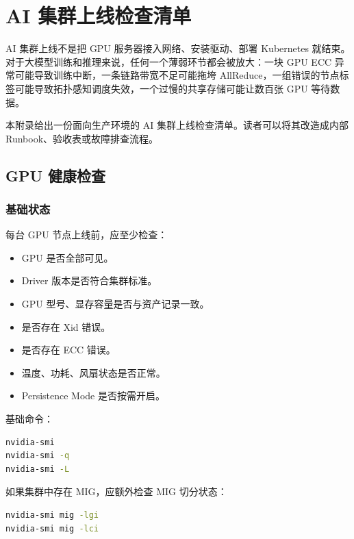 

\chapter{AI 集群上线检查清单}

AI 集群上线不是把 GPU 服务器接入网络、安装驱动、部署 Kubernetes 就结束。对于大模型训练和推理来说，任何一个薄弱环节都会被放大：一块 GPU ECC 异常可能导致训练中断，一条链路带宽不足可能拖垮 AllReduce，一组错误的节点标签可能导致拓扑感知调度失效，一个过慢的共享存储可能让数百张 GPU 等待数据。

本附录给出一份面向生产环境的 AI 集群上线检查清单。读者可以将其改造成内部 Runbook、验收表或故障排查流程。

\section{GPU 健康检查}

\subsection{基础状态}

每台 GPU 节点上线前，应至少检查：

\begin{itemize}
\item GPU 是否全部可见。
\item Driver 版本是否符合集群标准。
\item GPU 型号、显存容量是否与资产记录一致。
\item 是否存在 Xid 错误。
\item 是否存在 ECC 错误。
\item 温度、功耗、风扇状态是否正常。
\item Persistence Mode 是否按需开启。
\end{itemize}

基础命令：

\begin{lstlisting}[language=bash,caption={GPU 基础健康检查},label={lst:gpu-health-basic}]
nvidia-smi
nvidia-smi -q
nvidia-smi -L
\end{lstlisting}

如果集群中存在 MIG，应额外检查 MIG 切分状态：

\begin{lstlisting}[language=bash,caption={MIG 状态检查},label={lst:mig-check}]
nvidia-smi mig -lgi
nvidia-smi mig -lci
\end{lstlisting}

